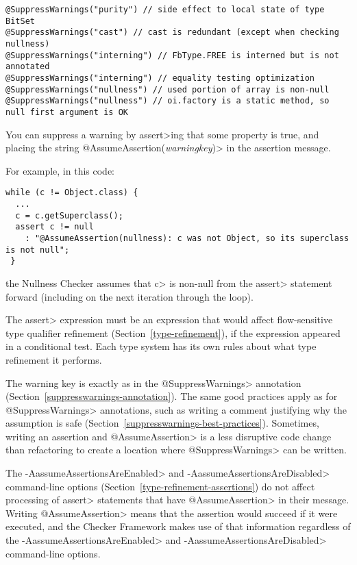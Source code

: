 \begin{Verbatim}
@SuppressWarnings("purity") // side effect to local state of type BitSet
@SuppressWarnings("cast") // cast is redundant (except when checking nullness)
@SuppressWarnings("interning") // FbType.FREE is interned but is not annotated
@SuppressWarnings("interning") // equality testing optimization
@SuppressWarnings("nullness") // used portion of array is non-null
@SuppressWarnings("nullness") // oi.factory is a static method, so null first argument is OK
\end{Verbatim}




\begin{sloppypar}
You can suppress a warning by \<assert>ing that some property is true, and
placing the string \<@AssumeAssertion(\emph{warningkey})> in the assertion
message.
\end{sloppypar}

For example, in this code:

\begin{Verbatim}
while (c != Object.class) {
  ...
  c = c.getSuperclass();
  assert c != null
    : "@AssumeAssertion(nullness): c was not Object, so its superclass is not null";
 }
\end{Verbatim}

\noindent
the Nullness Checker assumes that \<c> is non-null from the \<assert>
statement forward (including on the next iteration through the loop).

The \<assert> expression must be an expression that would affect flow-sensitive
type qualifier refinement (Section~\ref{type-refinement}), if the
expression appeared in a conditional test.  Each type system has its own
rules about what type refinement it performs.

The warning key is exactly as in the \<@SuppressWarnings> annotation
(Section~\ref{suppresswarnings-annotation}).  The same good practices apply
as for \<@SuppressWarnings> annotations, such as writing a comment
justifying why the assumption is safe
(Section~\ref{suppresswarnings-best-practices}).
Sometimes, writing an assertion and \<@AssumeAssertion> is a less
disruptive code change than refactoring to create a location where
\<@SuppressWarnings> can be written.

The \<-AassumeAssertionsAreEnabled> and \<-AassumeAssertionsAreDisabled>
command-line options (Section~\ref{type-refinement-assertions}) do not
affect processing of \<assert> statements that have \<@AssumeAssertion> in
their message.  Writing \<@AssumeAssertion> means that the assertion would
succeed if it were executed, and the Checker Framework makes use of that
information regardless of the \<-AassumeAssertionsAreEnabled> and
\<-AassumeAssertionsAreDisabled> command-line options.


